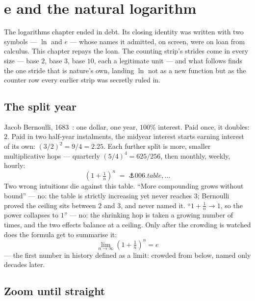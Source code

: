 \chapter{e and the natural logarithm}

\begin{narrative}
The logarithms chapter ended in debt. Its closing identity was written
with two symbols — $\ln$ and $e$ — whose names it admitted, on screen,
were on loan from calculus. This chapter repays the loan. The counting
strip's strides come in every size — base $2$, base $3$, base $10$,
each a legitimate unit — and what follows finds the one stride that is
nature's own, landing $\ln$ not as a new function but as the counter
row every earlier strip was secretly ruled in.

\section{The split year}

Jacob Bernoulli,
1683~\cite{calculus-plus-magazine-maths-in-a-minute-compound-interest-and-e}:
one dollar, one year, $100\%$ interest. Paid once, it doubles: $2$.
Paid in two half-year instalments, the midyear interest starts earning
interest of its own: $(3/2)^2 = 9/4 = 2.25$. Each further split is
more, smaller multiplicative hops — quarterly $(5/4)^4 = 625/256$,
then monthly, weekly, hourly:
\[
  \left(1 + \tfrac{1}{n}\right)^{\!n}
  \;=\; \anchor{006.table}, \ldots
\]
Two wrong intuitions die against this table. ``More compounding grows
without bound'' — no: the table is strictly increasing yet never
reaches $3$; Bernoulli proved the ceiling sits between $2$ and $3$,
and never named it. ``$1 + \tfrac1n \to 1$, so the power collapses to
$1$'' — no: the shrinking hop is taken a growing number of times, and
the two effects balance at a ceiling. Only after the crowding is
watched does the formula get to summarise it:
\[
  \lim_{n \to \infty} \left(1 + \tfrac{1}{n}\right)^{\!n} = e
  \]
— the first number in history defined as a limit: crowded from below,
named only decades later.

\section{Zoom until straight}


\end{narrative}
